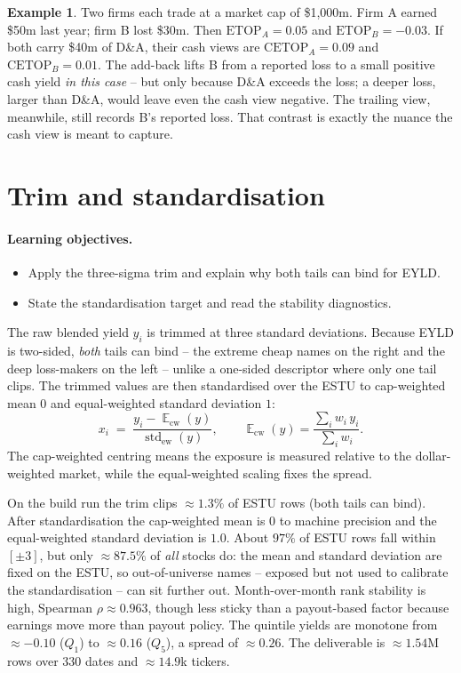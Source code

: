 \documentclass[11pt]{article}
\theoremstyle{definition}
\newtheorem{example}{Example}[section]
\theoremstyle{plain}
\theoremstyle{remark}
\DeclareMathOperator{\std}{std}
\DeclareMathOperator*{\avg}{\mathbb{E}}
\begin{document}
\begin{example}
Two firms each trade at a market cap of \$1,000m. Firm A earned \$50m last year; firm B lost \$30m. Then $\text{ETOP}_A = 0.05$ and $\text{ETOP}_B = -0.03$. If both carry \$40m of D\&A, their cash views are $\text{CETOP}_A = 0.09$ and $\text{CETOP}_B = 0.01$. The add-back lifts B from a reported loss to a small positive cash yield \emph{in this case} -- but only because D\&A exceeds the loss; a deeper loss, larger than D\&A, would leave even the cash view negative. The trailing view, meanwhile, still records B's reported loss. That contrast is exactly the nuance the cash view is meant to capture.
\end{example}

\section{Trim and standardisation}\label{sec:std}

\paragraph{Learning objectives.}
\begin{itemize}[leftmargin=1.4em,topsep=2pt]
  \item Apply the three-sigma trim and explain why both tails can bind for EYLD.
  \item State the standardisation target and read the stability diagnostics.
\end{itemize}

The raw blended yield $y_i$ is trimmed at three standard deviations. Because EYLD is two-sided, \emph{both} tails can bind -- the extreme cheap names on the right and the deep loss-makers on the left -- unlike a one-sided descriptor where only one tail clips. The trimmed values are then standardised over the ESTU to cap-weighted mean $0$ and equal-weighted standard deviation $1$:
\[
x_i \;=\; \frac{y_i - \avg_{\text{cw}}(y)}{\std_{\text{ew}}(y)},
\qquad
\avg_{\text{cw}}(y) = \frac{\sum_i w_i\, y_i}{\sum_i w_i}.
\]
The cap-weighted centring means the exposure is measured relative to the dollar-weighted market, while the equal-weighted scaling fixes the spread.

\begin{observed}
On the build run the trim clips $\approx 1.3\%$ of ESTU rows (both tails can bind). After standardisation the cap-weighted mean is $0$ to machine precision and the equal-weighted standard deviation is $1.0$. About $97\%$ of ESTU rows fall within $[\pm 3]$, but only $\approx 87.5\%$ of \emph{all} stocks do: the mean and standard deviation are fixed on the ESTU, so out-of-universe names -- exposed but not used to calibrate the standardisation -- can sit further out. Month-over-month rank stability is high, Spearman $\rho \approx 0.963$, though less sticky than a payout-based factor because earnings move more than payout policy. The quintile yields are monotone from $\approx -0.10$ ($Q_1$) to $\approx 0.16$ ($Q_5$), a spread of $\approx 0.26$. The deliverable is $\approx 1.54$M rows over 330 dates and $\approx 14.9$k tickers.
\end{observed}
\end{document}
